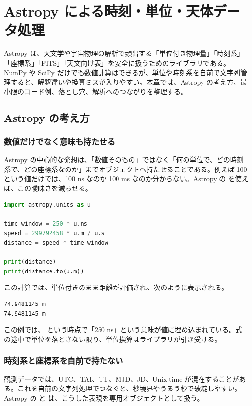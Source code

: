 \chapter{Astropy による時刻・単位・天体データ処理}
\label{chap:astropy}

Astropy は、天文学や宇宙物理の解析で頻出する「単位付き物理量」「時刻系」「座標系」「FITS」「天文向け表」を安全に扱うためのライブラリである。NumPy や SciPy だけでも数値計算はできるが、単位や時刻系を自前で文字列管理すると、解釈違いや換算ミスが入りやすい。本章では、Astropy の考え方、最小限のコード例、落とし穴、解析へのつながりを整理する。

\section{Astropy の考え方}

\subsection{数値だけでなく意味も持たせる}

Astropy の中心的な発想は、「数値そのもの」ではなく「何の単位で、どの時刻系で、どの座標系なのか」までオブジェクトへ持たせることである。例えば 100 という値だけでは、100 ns なのか 100 ms なのか分からない。Astropy の  を使えば、この曖昧さを減らせる。

\begin{lstlisting}[language=Python]
import astropy.units as u

time_window = 250 * u.ns
speed = 299792458 * u.m / u.s
distance = speed * time_window

print(distance)
print(distance.to(u.m))
\end{lstlisting}

この計算では、単位付きのまま距離が評価され、次のように表示される。

\begin{lstlisting}[numbers=none, xleftmargin=2\zw]
74.9481145 m
74.9481145 m
\end{lstlisting}

この例では、 という時点で「250 ns」という意味が値に埋め込まれている。式の途中で単位を落とさない限り、単位換算はライブラリが引き受ける。

\subsection{時刻系と座標系を自前で持たない}

観測データでは、UTC、TAI、TT、MJD、JD、Unix time が混在することがある。これを自前の文字列処理でつなぐと、秒境界やうるう秒で破綻しやすい。Astropy の  と  は、こうした表現を専用オブジェクトとして扱う。

